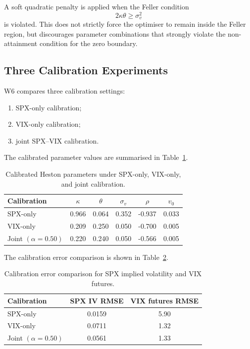A soft quadratic penalty is applied when the Feller condition
\begin{equation}
2\kappa\theta \geq \sigma_v^2
\end{equation}
is violated. This does not strictly force the optimiser to remain inside the Feller region, but discourages parameter combinations that strongly violate the non-attainment condition for the zero boundary.

\subsection{Three Calibration Experiments}

W6 compares three calibration settings:
\begin{enumerate}
    \item SPX-only calibration;
    \item VIX-only calibration;
    \item joint SPX--VIX calibration.
\end{enumerate}

The calibrated parameter values are summarised in Table~\ref{tab:w6_calibrated_parameters}.

\begin{table}[htbp]
\centering
\begin{tabular}{lccccc}
\toprule
Calibration & \(\kappa\) & \(\theta\) & \(\sigma_v\) & \(\rho\) & \(v_0\) \\
\midrule
SPX-only & 0.966 & 0.064 & 0.352 & -0.937 & 0.033 \\
VIX-only & 0.209 & 0.250 & 0.050 & -0.700 & 0.005 \\
Joint \((\alpha=0.50)\) & 0.220 & 0.240 & 0.050 & -0.566 & 0.005 \\
\bottomrule
\end{tabular}
\caption{Calibrated Heston parameters under SPX-only, VIX-only, and joint calibration.}
\label{tab:w6_calibrated_parameters}
\end{table}

The calibration error comparison is shown in Table~\ref{tab:w6_calibration_errors}.

\begin{table}[htbp]
\centering
\begin{tabular}{lcc}
\toprule
Calibration & SPX IV RMSE & VIX futures RMSE \\
\midrule
SPX-only & 0.0159 & 5.90 \\
VIX-only & 0.0711 & 1.32 \\
Joint \((\alpha=0.50)\) & 0.0561 & 1.33 \\
\bottomrule
\end{tabular}
\caption{Calibration error comparison for SPX implied volatility and VIX futures.}
\label{tab:w6_calibration_errors}
\end{table}

